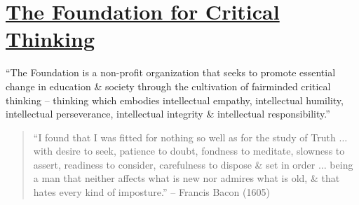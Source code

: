 \documentclass[oneside]{book}
\numberwithin{equation}{section}
\begin{document}

\chapter{\href{https://www.criticalthinking.org/}{The Foundation for Critical Thinking}}

``The Foundation is a non-profit organization that seeks to promote essential change in education \& society through the cultivation of fairminded critical thinking -- thinking which embodies intellectual empathy, intellectual humility, intellectual perseverance, intellectual integrity \& intellectual responsibility.''

\begin{quotation}
	``I found that I was fitted for nothing so well as for the study of Truth $\ldots$ with desire to seek, patience to doubt, fondness to meditate, slowness to assert, readiness to consider, carefulness to dispose \& set in order $\ldots$ being a man that neither affects what is new nor admires what is old, \& that hates every kind of imposture.'' -- Francis Bacon (1605)
\end{quotation}
\end{document}
